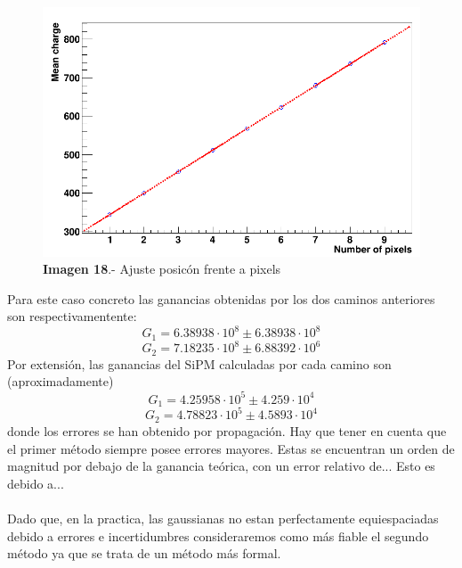 \begin{itemize}
\begin{itemize}
	\begin{figure}[hbtp]
		\centering
		\includegraphics[scale=0.2]{FitPosicionPixels.png}
		\caption{\textbf{Imagen 18}.- Ajuste posicón frente a pixels}
		\end{figure}
			
	
	\end{itemize}
	
Para este caso concreto las ganancias obtenidas por los dos caminos anteriores son respectivamentente:
$$G_1= 6.38938 \cdot 10^8 \pm  6.38938 \cdot 10^8 $$  
$$G_2=7.18235 \cdot 10^8 \pm 6.88392 \cdot 10^6$$
Por extensión, las ganancias del SiPM calculadas por cada camino son (aproximadamente) 
$$G_1= 4.25958 \cdot 10^5 \pm 4.259 \cdot 10^4$$  
$$G_2= 4.78823 \cdot 10^5 \pm 4.5893 \cdot 10^4$$
donde los errores se han obtenido por propagación. Hay que tener en cuenta que el primer método siempre posee errores mayores. Estas se encuentran un orden de magnitud por debajo de la ganancia teórica, con un error relativo de... Esto es debido a...

\paragraph {}
Dado que, en la practica, las gaussianas no estan perfectamente equiespaciadas debido a errores e incertidumbres consideraremos como más fiable el segundo método ya que se trata de un método más formal. 


\end{itemize}